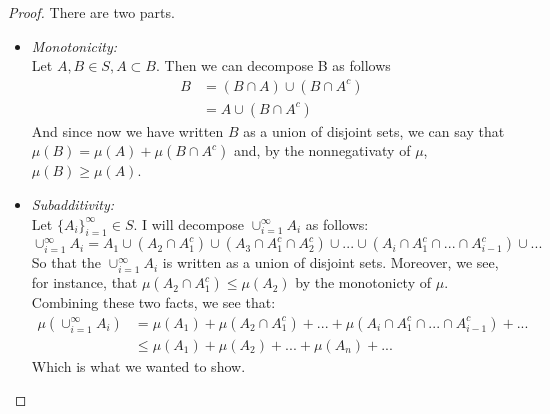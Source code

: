 \documentclass[12pt]{article}
\newenvironment{problem}[2][Problem]{\begin{trivlist}
\item[\hskip \labelsep {\bfseries #1}\hskip \labelsep {\bfseries #2.}]}{\end{trivlist}}
\theoremstyle{definition}
\theoremstyle{definition}
\theoremstyle{definition}
\theoremstyle{definition}
\begin{document}
\begin{problem}{1.17}
\begin{proof} There are two parts.
\begin{itemize}
\item \textit{Monotonicity:} \\
Let $A, B \in S, A \subset B$. Then we can decompose B as follows
\begin{align*}
B &= (B \cap A) \cup (B \cap A^c) \\
 &= A \cup (B \cap A^c)
\end{align*}
And since now we have written $B$ as a union of disjoint sets, we can say that $\mu(B) = \mu(A) + \mu(B \cap A^c) $ and, by the nonnegativaty of $\mu$, $\mu(B) \geq \mu(A)$.
\item \textit{Subadditivity:} \\
Let $\{ A_i \}_{i=1}^{\infty} \in S $. I will decompose $\cup_{i=1}^{\infty}A_i$ as follows: 
$$ \cup_{i=1}^{\infty}A_i = A_1 \cup (A_2 \cap A_1^c) \cup (A_3 \cap A_1^c \cap A_2^c) \cup ... \cup (A_i \cap A_1^c \cap ... \cap A_{i-1}^c) \cup ... $$
So that the $\cup_{i=1}^{\infty}A_i$ is written as a union of disjoint sets. Moreover, we see, for instance, that $\mu(A_2 \cap A_1^c) \leq \mu(A_2)$ by the monotonicty of $\mu$. Combining these two facts, we see that: 
\begin{align*}
\mu(\cup_{i=1}^{\infty}A_i) &= \mu(A_1) 
+ \mu(A_2 \cap A_1^c) + ... + \mu(A_i \cap A_1^c \cap ... \cap A_{i-1}^c) + ... \\
&\leq \mu(A_1)+\mu(A_2)+...+\mu(A_n)+...
\end{align*}
Which is what we wanted to show.
\end{itemize}
\end{proof}
\end{problem}
\end{document}
